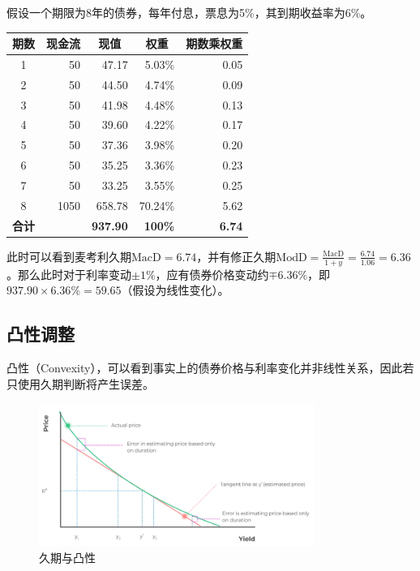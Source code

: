 \documentclass[11pt]{article}
\begin{document}
\begin{example}
    假设一个期限为8年的债券，每年付息，票息为5\%，其到期收益率为6\%。

    \begin{table}[H]
    \centering
    \begin{tabular}{@{}crrrr@{}}
    \toprule
    \textbf{期数} & \multicolumn{1}{c}{\textbf{现金流}} & \multicolumn{1}{c}{\textbf{现值}} & \multicolumn{1}{c}{\textbf{权重}} & \multicolumn{1}{c}{\textbf{期数乘权重}} \\ \midrule
    1 & 50 & 47.17 & 5.03\% & 0.05 \\
    2 & 50 & 44.50 & 4.74\% & 0.09 \\
    3 & 50 & 41.98 & 4.48\% & 0.13 \\
    4 & 50 & 39.60 & 4.22\% & 0.17 \\
    5 & 50 & 37.36 & 3.98\% & 0.20 \\
    6 & 50 & 35.25 & 3.36\% & 0.23 \\
    7 & 50 & 33.25 & 3.55\% & 0.25 \\
    8 & 1050 & 658.78 & 70.24\% & 5.62 \\ \midrule
    \textbf{合计} & \textbf{} & \textbf{937.90} & \textbf{100\%} & \textbf{6.74} \\ \bottomrule
    \end{tabular}
    \end{table}

    此时可以看到麦考利久期$\text{MacD} = 6.74$，并有修正久期$\text{ModD} = \frac{\text{MacD}}{1+y} = \frac{6.74}{1.06} = 6.36$。那么此时对于利率变动$\pm 1\%$，应有债券价格变动约$\mp 6.36\%$，即$937.90 \times 6.36\% = 59.65$（假设为线性变化）。
\end{example}


\subsection{凸性调整}

凸性（Convexity），可以看到事实上的债券价格与利率变化并非线性关系，因此若只使用久期判断将产生误差。

\begin{figure}[H]
    \centering
    \includegraphics[width=0.8\textwidth]{fig/duration-convexity.png}
    \caption{久期与凸性}
    \label{fig:duration-convexity}
\end{figure}
\end{document}
